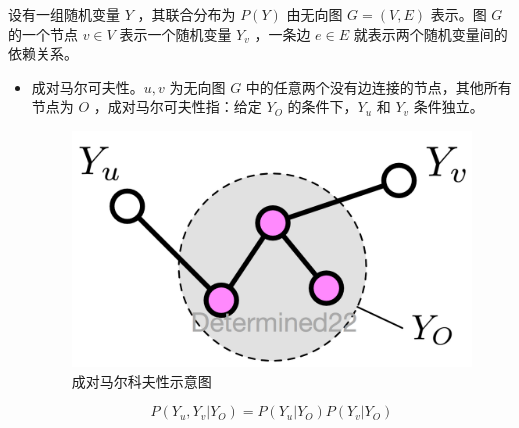 设有一组随机变量 $Y$ ，其联合分布为 $P(Y)$ 由无向图 $G=(V, E)$ 表示。图 $G$ 的一个节点 $v \in V$ 表示一个随机变量 $Y_v$ ，一条边 $e \in E$ 就表示两个随机变量间的依赖关系。

\begin{itemize}
	\item 成对马尔可夫性。$u, v$ 为无向图 $G$ 中的任意两个没有边连接的节点，其他所有节点为 $O$ ，成对马尔可夫性指：给定 $Y_O$ 的条件下，$Y_u$ 和 $Y_v$ 条件独立。
	\begin{figure}[ht]
		\centering
		\includegraphics[width=\linewidth/2]{figures/Markov1.png}
		\caption{成对马尔科夫性示意图}
    	\label{fig:Markov2}
	\end{figure}
	\begin{equation}
		P(Y_{u}, Y_{v} | Y_{O})=P\left(Y_{u} | Y_{O}\right) P\left(Y_{v} | Y_{O}\right)
	\end{equation}
	

\end{itemize}
